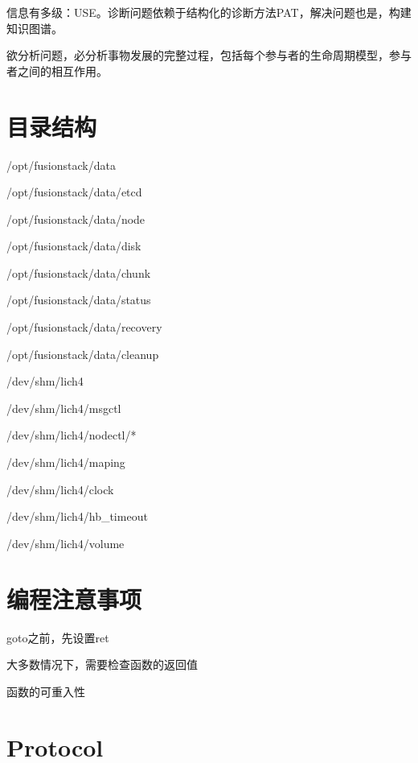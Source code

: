 信息有多级：USE。诊断问题依赖于结构化的诊断方法PAT，解决问题也是，构建知识图谱。

欲分析问题，必分析事物发展的完整过程，包括每个参与者的生命周期模型，参与者之间的相互作用。

\section{目录结构}

\begin{enumbox}
\item /opt/fusionstack/data
\item /opt/fusionstack/data/etcd
\item /opt/fusionstack/data/node
\item /opt/fusionstack/data/disk
\item /opt/fusionstack/data/chunk
\item /opt/fusionstack/data/status
\item /opt/fusionstack/data/recovery
\item /opt/fusionstack/data/cleanup
\item 
\item /dev/shm/lich4
\item /dev/shm/lich4/msgctl
\item /dev/shm/lich4/nodectl/*
\item /dev/shm/lich4/maping
\item /dev/shm/lich4/clock
\item /dev/shm/lich4/hb\_timeout
\item /dev/shm/lich4/volume
\end{enumbox}

\section{编程注意事项}

\begin{compactitem}
\item goto之前，先设置ret
\item 大多数情况下，需要检查函数的返回值
\item 函数的可重入性
\end{compactitem}

\section{Protocol}

